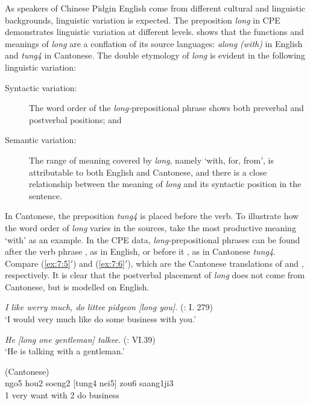 \documentclass[english,output=paper,colorlinks,citecolor=brown]{../langscibook}
\begin{document}
As speakers of Chinese Pidgin English come from different cultural and linguistic backgrounds, linguistic variation is expected. The preposition \textit{long} in CPE demonstrates linguistic variation at different levels. \citet{Li2011} shows that the functions and meanings of \textit{long} are a conflation of its source languages: \textit{along (with)} in English and \textit{tung4} in Cantonese. The double etymology of \textit{long} is evident in the following linguistic variation:

\begin{description}
\item [Syntactic variation:] The word order of the \textit{long-}prepositional phrase shows both preverbal and postverbal positions; and 
\item [Semantic variation:] The range of meaning covered by \textit{long}, namely ‘with, for, from’, is attributable to both English and Cantonese, and there is a close relationship between the meaning of \textit{long} and its syntactic position in the sentence.
\end{description}

In Cantonese, the preposition \textit{tung4} is placed before the verb. To illustrate how the word order of \textit{long} varies in the sources, take the most productive meaning ‘with’ as an example. In the CPE data, \textit{long-}prepositional phrases can be found after the verb phrase , as in English, or before it , as in Cantonese \textit{tung4}. Compare (\ref{ex:7:5}$'$) and (\ref{ex:7:6}$'$), which are the Cantonese translations of  and , respectively. It is clear that the postverbal placement of \textit{long} does not come from Cantonese, but is modelled on English. 

\ea%
    \label{ex:7:5}
\textit{I like werry much, do littee pidgeon [long you].} (\citealt{Downing1838}: I. 279)\\
\glt ‘I would very much like do some business with you.’ 

\ex%
    \label{ex:7:6}
\textit{He [long one gentleman] talkee.} (\citealt{Tong1862}: VI.39)\\
\glt ‘He is talking with a gentleman.’ 

 (Cantonese)\\
\gll ngo5  hou2  soeng2   [tung4   nei5]  zou6  saang1ji3\\
1    very   want    with      2    do   business\\
\end{document}
